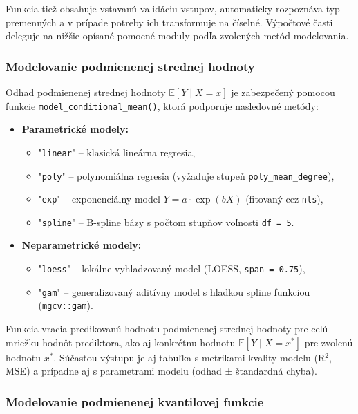 Funkcia tiež obsahuje vstavanú validáciu vstupov, automaticky rozpoznáva typ premenných a v prípade potreby ich transformuje na číselné. Výpočtové časti deleguje na nižšie opísané pomocné moduly podľa zvolených metód modelovania.

\subsubsection{Modelovanie podmienenej strednej hodnoty}\label{subsec:app_cond_mean}

Odhad podmienenej strednej hodnoty $\mathbb{E}[Y \mid X = x]$ je zabezpečený pomocou funkcie \texttt{model\_conditional\_mean()}, ktorá podporuje nasledovné metódy:

\begin{itemize}
  \item \textbf{Parametrické modely:}
  \begin{itemize}
  \setlength{\itemsep}{0pt}
  \setlength{\parskip}{0pt}
    \item "\texttt{linear}" – klasická lineárna regresia,
    \item "\texttt{poly}" – polynomiálna regresia (vyžaduje stupeň \texttt{poly\_mean\_degree}),
    \item "\texttt{exp}" – exponenciálny model $Y = a \cdot \exp(bX)$ (fitovaný cez \texttt{nls}),
    \item "\texttt{spline}" – B-spline bázy s počtom stupňov voľnosti \texttt{df = 5}.
  \end{itemize}
  \item \textbf{Neparametrické modely:}
  \begin{itemize}
  \setlength{\itemsep}{0pt}
  \setlength{\parskip}{0pt}
    \item "\texttt{loess}" – lokálne vyhladzovaný model (LOESS, \texttt{span = 0.75}),
    \item "\texttt{gam}" – generalizovaný aditívny model s hladkou spline funkciou (\texttt{mgcv::gam}).
  \end{itemize}
\end{itemize}

Funkcia vracia predikovanú hodnotu podmienenej strednej hodnoty pre celú mriežku hodnôt prediktora, ako aj konkrétnu hodnotu $\mathbb{E}[Y \mid X = x^*]$ pre zvolenú hodnotu $x^*$. Súčasťou výstupu je aj tabuľka s metrikami kvality modelu (R$^2$, MSE) a prípadne aj s parametrami modelu (odhad ± štandardná chyba).

\subsubsection{Modelovanie podmienenej kvantilovej funkcie}\label{subsec:app_cond_quantile}

